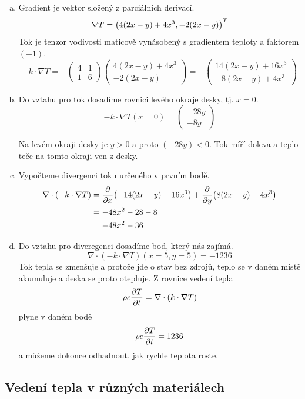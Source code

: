 \reseni
\begin{enumerate}[a)]
\item Gradient je vektor složený z parciálních derivací. $$\nabla T=\qty(
  4(2x-y)+4x^3,-2(2x-y))^T$$ Tok je tenzor vodivosti maticově vynásobený s gradientem teploty a faktorem $(-1)$.
  $$-k\cdot \nabla T=-
  \begin{pmatrix}
    4&1\\1&6
  \end{pmatrix}
  \begin{pmatrix}
    4(2x-y)+4x^3\\-2(2x-y)
  \end{pmatrix}
  =-
  \begin{pmatrix}
    14(2x- y)+16x^3\\-8(2x- y)+4x^3
  \end{pmatrix}
$$
\item Do vztahu pro tok dosadíme rovnici levého okraje desky, tj. $x=0$.
  $$-k\cdot \nabla T (x=0)=
  \begin{pmatrix}
    -28y\\-8y
  \end{pmatrix}
  $$
  
  Na levém okraji desky je $y>0$ a proto $(-28y)<0$. Tok míří doleva a teplo teče na tomto okraji ven z desky.
\item  Vypočteme divergenci toku určeného v prvním bodě. $$
  \begin{aligned}
\nabla \cdot (-k\cdot \nabla T )&=\pdv{x}(-14(2x- y)-16x^3)+\pdv{y}(8(2x- y)-4x^3)\\&=-48x^2-28-8\\&=-48x^2-36
\end{aligned}
$$
\item Do vztahu pro diveregenci dosadíme bod, který nás zajímá. $$\nabla \cdot (-k\cdot \nabla T )(x=5,y=5)=-1236$$ Tok tepla se zmenšuje a protože jde o stav bez zdrojů, teplo se v daném místě akumuluje a deska se proto otepluje. Z rovnice vedení tepla
  $$\rho c\pdv{T}{t}=\nabla\cdot(k \cdot \nabla T)$$
  plyne v daném bodě
  $$\rho c\pdv{T}{t}=1236$$
  a můžeme dokonce odhadnout, jak rychle teplota roste.
\end{enumerate}
\konec


\subsection{Vedení tepla v různých materiálech}

